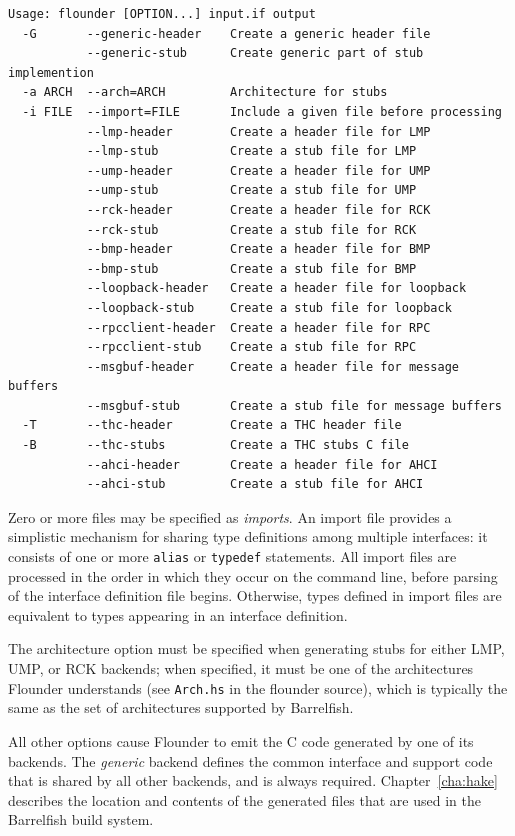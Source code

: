 \documentclass[a4paper,twoside]{report} %
\begin{document}
\begin{verbatim}
Usage: flounder [OPTION...] input.if output
  -G       --generic-header    Create a generic header file
           --generic-stub      Create generic part of stub implemention
  -a ARCH  --arch=ARCH         Architecture for stubs
  -i FILE  --import=FILE       Include a given file before processing
           --lmp-header        Create a header file for LMP
           --lmp-stub          Create a stub file for LMP
           --ump-header        Create a header file for UMP
           --ump-stub          Create a stub file for UMP
           --rck-header        Create a header file for RCK
           --rck-stub          Create a stub file for RCK
           --bmp-header        Create a header file for BMP
           --bmp-stub          Create a stub file for BMP
           --loopback-header   Create a header file for loopback
           --loopback-stub     Create a stub file for loopback
           --rpcclient-header  Create a header file for RPC
           --rpcclient-stub    Create a stub file for RPC
           --msgbuf-header     Create a header file for message buffers
           --msgbuf-stub       Create a stub file for message buffers
  -T       --thc-header        Create a THC header file
  -B       --thc-stubs         Create a THC stubs C file
           --ahci-header       Create a header file for AHCI
           --ahci-stub         Create a stub file for AHCI
\end{verbatim}

Zero or more files may be specified as \emph{imports}. An import file
provides a simplistic mechanism for sharing type definitions among multiple
interfaces: it consists of one or more \texttt{alias} or \texttt{typedef}
statements. All import files are processed in the order in which they occur on
the command line, before parsing of the interface definition file begins.
Otherwise, types defined in import files are equivalent to types appearing in
an interface definition.

The architecture option must be specified when generating stubs for either LMP,
UMP, or RCK backends; when specified, it must be one of the architectures
Flounder understands (see \texttt{Arch.hs} in the flounder source), which is
typically the same as the set of architectures supported by Barrelfish.

All other options cause Flounder to emit the C code generated by one of its
backends. The \emph{generic} backend defines the common interface and support
code that is shared by all other backends, and is always required.
Chapter~\ref{cha:hake} describes the location and contents of the generated
files that are used in the Barrelfish build system.
\end{document}

